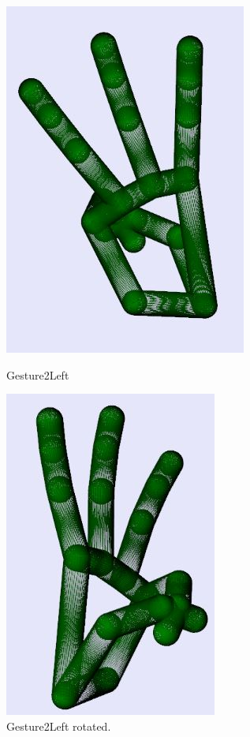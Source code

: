 \begin{figure}[H]
    \centering
    \begin{minipage}{0.5\textwidth}
        \centering
        \includegraphics[scale=.75]{Figures/gesture2Left.JPG} 
        \caption[Gesture2Left]{Gesture2Left}
		\label{fig:Gesture2Left}
    \end{minipage}\hfill
    \begin{minipage}{0.5\textwidth}
        \centering
        \includegraphics[scale=.75]{Figures/gesture2Left_rotated.JPG}
        \caption[Gesture2Left Rotated]{Gesture2Left rotated.}
        \label{fig:Gesture2Left_rotated}
    \end{minipage}
\end{figure}

